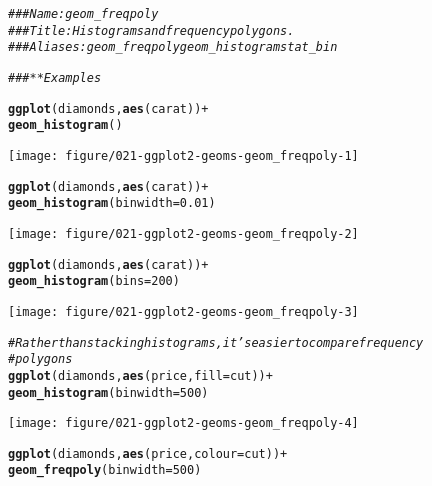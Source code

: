 \documentclass[a4paper,titlepage]{tufte-handout}\usepackage[]{graphicx}\usepackage[]{color}
\makeatletter
\def\maxwidth{ %
  \ifdim\Gin@nat@width>\linewidth
    \linewidth
  \else
    \Gin@nat@width
  \fi
}
\newcommand{\hlnum}[1]{\textcolor[rgb]{0.686,0.059,0.569}{#1}}%
\newcommand{\hlcom}[1]{\textcolor[rgb]{0.678,0.584,0.686}{\textit{#1}}}%
\newcommand{\hlopt}[1]{\textcolor[rgb]{0,0,0}{#1}}%
\newcommand{\hlstd}[1]{\textcolor[rgb]{0.345,0.345,0.345}{#1}}%
\newcommand{\hlkwc}[1]{\textcolor[rgb]{0.333,0.667,0.333}{#1}}%
\newcommand{\hlkwd}[1]{\textcolor[rgb]{0.737,0.353,0.396}{\textbf{#1}}}%
\newenvironment{kframe}{%
 \def\at@end@of@kframe{}%
 \ifinner\ifhmode%
  \def\at@end@of@kframe{\end{minipage}}%
  \begin{minipage}{\columnwidth}%
 \fi\fi%
 \def\FrameCommand##1{\hskip\@totalleftmargin \hskip-\fboxsep
 \colorbox{shadecolor}{##1}\hskip-\fboxsep
     \hskip-\linewidth \hskip-\@totalleftmargin \hskip\columnwidth}%
 \MakeFramed {\advance\hsize-\width
   \@totalleftmargin\z@ \linewidth\hsize
   \@setminipage}}%
 {\par\unskip\endMakeFramed%
 \at@end@of@kframe}
\newenvironment{knitrout}{}{} %
\makeatother
\begin{document}
\begin{knitrout}
\color{fgcolor}\begin{kframe}
\begin{alltt}
\hlcom{### Name: geom_freqpoly}
\hlcom{### Title: Histograms and frequency polygons.}
\hlcom{### Aliases: geom_freqpoly geom_histogram stat_bin}

\hlcom{### ** Examples}

\hlkwd{ggplot}\hlstd{(diamonds,} \hlkwd{aes}\hlstd{(carat))} \hlopt{+}
  \hlkwd{geom_histogram}\hlstd{()}
\end{alltt}


{\ttfamily\noindent\itshape\color{messagecolor}{\#\# `stat\_bin()` using `bins = 30`. Pick better value with `binwidth`.}}\end{kframe}
\texttt{[image: figure/021-ggplot2-geoms-geom\_freqpoly-1]} 
\begin{kframe}\begin{alltt}
\hlkwd{ggplot}\hlstd{(diamonds,} \hlkwd{aes}\hlstd{(carat))} \hlopt{+}
  \hlkwd{geom_histogram}\hlstd{(}\hlkwc{binwidth} \hlstd{=} \hlnum{0.01}\hlstd{)}
\end{alltt}
\end{kframe}
\texttt{[image: figure/021-ggplot2-geoms-geom\_freqpoly-2]} 
\begin{kframe}\begin{alltt}
\hlkwd{ggplot}\hlstd{(diamonds,} \hlkwd{aes}\hlstd{(carat))} \hlopt{+}
  \hlkwd{geom_histogram}\hlstd{(}\hlkwc{bins} \hlstd{=} \hlnum{200}\hlstd{)}
\end{alltt}
\end{kframe}
\texttt{[image: figure/021-ggplot2-geoms-geom\_freqpoly-3]} 
\begin{kframe}\begin{alltt}
\hlcom{# Rather than stacking histograms, it's easier to compare frequency}
\hlcom{# polygons}
\hlkwd{ggplot}\hlstd{(diamonds,} \hlkwd{aes}\hlstd{(price,} \hlkwc{fill} \hlstd{= cut))} \hlopt{+}
  \hlkwd{geom_histogram}\hlstd{(}\hlkwc{binwidth} \hlstd{=} \hlnum{500}\hlstd{)}
\end{alltt}
\end{kframe}
\texttt{[image: figure/021-ggplot2-geoms-geom\_freqpoly-4]} 
\begin{kframe}\begin{alltt}
\hlkwd{ggplot}\hlstd{(diamonds,} \hlkwd{aes}\hlstd{(price,} \hlkwc{colour} \hlstd{= cut))} \hlopt{+}
  \hlkwd{geom_freqpoly}\hlstd{(}\hlkwc{binwidth} \hlstd{=} \hlnum{500}\hlstd{)}

\end{alltt}
\end{kframe}
\end{knitrout}
\end{document}
